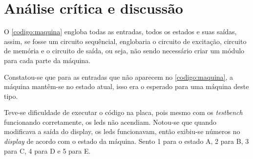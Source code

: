 \chapter{Análise crítica e discussão}
	O \autoref{codigo:maquina} engloba todas as entradas, todos os estados e suas
	saídas, assim, se fosse um circuito sequêncial, englobaria o circuito de
	excitação, circuito de memória e o circuito de saída, ou seja, não sendo necessário
	criar um módulo para cada parte da máquina.

	Constatou-se que para as entradas que não aparecem no \autoref{codigo:maquina},
	a máquina mantêm-se no estado atual, isso era o esperado para uma máquina deste tipo.

	Teve-se dificuldade de executar o código na placa, pois mesmo com os \textit{testbench}
	funcionando corretamente, os \ac{led}s não acendiam. Notou-se que quando modificava a saída
	do display, os \ac{led}s funcionavam, então exibiu-se números no \textit{display} de acordo
	com o estado da máquina. Sento 1 para o estado A, 2 para B, 3 para C, 4 para D e 5 para E.

